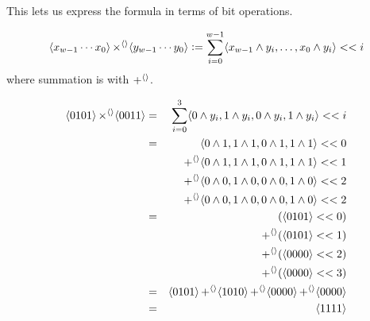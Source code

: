 This lets us express the formula in terms of bit operations.

\begin{definition}
\begin{align*}
  \langle x_{w-1}\cdots{}x_{0} \rangle \operatorname{\times^{\langle\rangle}} \langle y_{w-1}\cdots{}y_{0} \rangle \vcentcolon=
  \sum_{i=0}^{w-1} \langle x_{w-1} \land y_{i},\ldots,x_{0} \land y_{i} \rangle << i
\end{align*}
where summation is with $\operatorname{+^{\langle\rangle}}$.
\end{definition}

\begin{example}[$5 \times 3$]
  \begin{align*}
    \langle 0101 \rangle \operatorname{\times^{\langle\rangle}} \langle 0011 \rangle &=& \sum_{i=0}^{3} \langle 0 \land y_{i},1\land y_{i}, 0\land y_{i}, 1 \land y_{i} \rangle << i \\
                                              &=& \langle 0 \land 1,1\land 1, 0\land 1, 1 \land 1 \rangle << 0 \\
                                              &&\operatorname{+^{\langle\rangle}} \langle 0 \land 1,1\land 1, 0\land 1, 1 \land 1 \rangle << 1 \\
                                              &&\operatorname{+^{\langle\rangle}} \langle 0 \land 0,1\land 0, 0\land 0, 1 \land 0 \rangle << 2 \\
                                              &&\operatorname{+^{\langle\rangle}} \langle 0 \land 0,1\land 0, 0\land 0, 1 \land 0 \rangle << 2 \\
                                              &=&         (\langle 0101 \rangle << 0) \\
    &&\operatorname{+^{\langle\rangle}} (\langle 0101 \rangle << 1) \\
    && \operatorname{+^{\langle\rangle}} (\langle 0000 \rangle << 2) \\
                                              && \operatorname{+^{\langle\rangle}} (\langle 0000 \rangle << 3) \\
                                              &=& \langle 0101 \rangle \operatorname{+^{\langle\rangle}} \langle 1010 \rangle \operatorname{+^{\langle\rangle}} \langle 0000 \rangle  \operatorname{+^{\langle\rangle}} \langle 0000 \rangle \\
    &=& \langle 1111 \rangle
  \end{align*}
\end{example}


